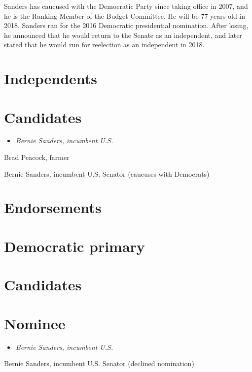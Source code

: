 Sanders has caucused with the Democratic Party since taking office in
2007, and he is the Ranking Member of the Budget Committee. He will be
77 years old in 2018. Sanders ran for the 2016 Democratic presidential
nomination. After losing, he announced that he would return to the
Senate as an independent, and later stated that he would run for
reelection as an independent in 2018.

\section{Independents}\label{independents}

\section{Candidates}\label{candidates}

\begin{itemize}
\item
  \emph{Bernie Sanders, incumbent U.S.}
\end{itemize}

Brad Peacock, farmer

Bernie Sanders, incumbent U.S. Senator (caucuses with Democrats)

\section{Endorsements}\label{endorsements}

\section{Democratic primary}\label{democratic-primary}

\section{Candidates}\label{candidates-1}

\section{Nominee}\label{nominee}

\begin{itemize}
\item
  \emph{Bernie Sanders, incumbent U.S.}
\end{itemize}

Bernie Sanders, incumbent U.S. Senator (declined nomination)

